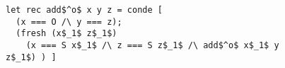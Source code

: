 \begin{figure}[!t]
  \centering
  \begin{minipage}{\columnwidth}
    \begin{lstlisting}[frame=tb]
let rec add$^o$ x y z = conde [
  (x === O /\ y === z);
  (fresh (x$_1$ z$_1$)
    (x === S x$_1$ /\ z === S z$_1$ /\ add$^o$ x$_1$ y z$_1$) ) ]
    \end{lstlisting}
  \end{minipage}
\end{figure}